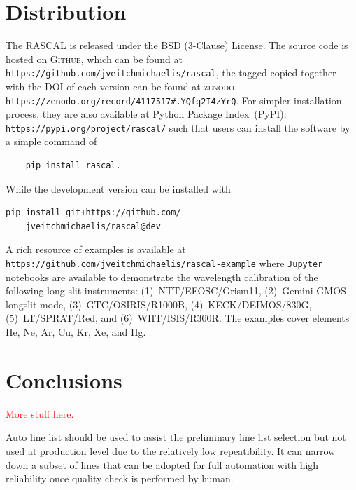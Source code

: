 \documentclass{aa}
\begin{document}
\section{Distribution}
The \textsc{RASCAL} is released under the BSD (3-Clause) License. The
source code is hosted on \textsc{Github}, which can be found at
\verb+https://github.com/jveitchmichaelis/rascal+, the tagged copied together
with the DOI of each version can be found at
\textsc{zenodo} \verb+https://zenodo.org/record/4117517#.YQfq2I4zYrQ+.
For simpler installation process, they are also available at Python
Package Index~(PyPI): \verb+https://pypi.org/project/rascal/+ such that
users can install the software by a simple command of 
\begin{verbatim}
    pip install rascal.
\end{verbatim}
While the development version can be installed with
\begin{verbatim}
pip install git+https://github.com/
    jveitchmichaelis/rascal@dev
\end{verbatim}

A rich resource of examples is available at
\verb+https://github.com/jveitchmichaelis/rascal-example+
where \verb+Jupyter+ notebooks are available to demonstrate the wavelength
calibration of the following long-slit instruments: (1)~NTT/EFOSC/Grism11,
(2)~Gemini GMOS longslit mode, (3)~GTC/OSIRIS/R1000B, (4)~KECK/DEIMOS/830G,
(5)~LT/SPRAT/Red, and (6)~WHT/ISIS/R300R. The examples cover elements
He, Ne, Ar, Cu, Kr, Xe, and Hg.

\section{Conclusions}

\textcolor{red}{More stuff here.}

Auto line list should be used to assist the preliminary line list selection
but not used at production level due to the relatively low repeatibility.
It can narrow down a subset of lines that can be adopted for full
automation with high reliability once quality check is performed by human.
\end{document}
